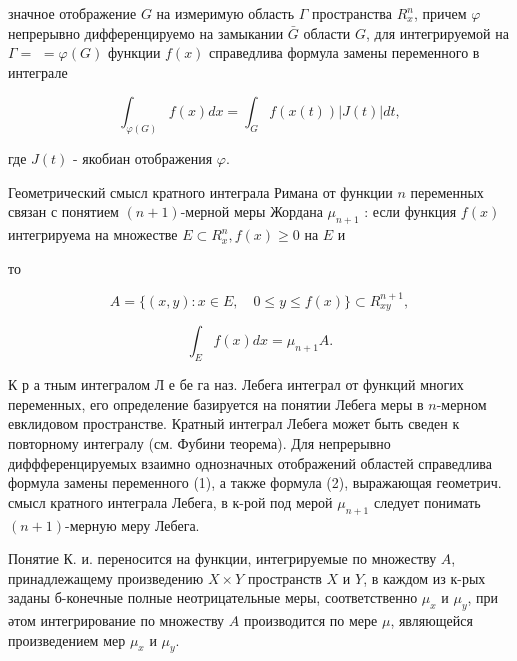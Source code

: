 \documentclass[10pt]{article}
\begin{document}
значное отображение $G$ на измеримую область $\Gamma$ пространства $R_{x}^{n}$, причем $\varphi$ непрерывно дифференцируемо на замыкании $\bar{G}$ области $G$, для интегрируемой на $\Gamma=$ $=\varphi(G)$ функции $f(x)$ справедлива формула замены переменного в интеграле



\[

\int_{\varphi(G)} f(x) d x=\int_{G} f(x(t))|J(t)| d t,

\]



где $J(t)$ - якобиан отображения $\varphi$.



Геометрический смысл кратного интеграла Римана от функции $n$ переменных связан с понятием $(n+1)$-мерной меры Жордана $\mu_{n+1}$ : если функция $f(x)$ интегрируема на множестве $E \subset R_{x}^{n}, f(x) \geqslant 0$ на $E$ и



то



\[

A=\{(x, y): x \in E, \quad 0 \leqslant y \leqslant f(x)\} \subset R_{x y}^{n+1},

\]



\[

\int_{E} f(x) d x=\mu_{n+1} A .

\]



К р а тным интегралом Л е бе га наз. Лебега интеграл от функций многих переменных, его определение базируется на понятии Лебега меры в $n$-мерном евклидовом пространстве. Кратный интеграл Лебега может быть сведен к повторному интегралу (см. Фубини теорема). Для непрерывно диффференцируемых взаимно однозначных отображений областей справедлива формула замены переменного (1), а также формула (2), выражающая геометрич. смысл кратного интеграла Лебега, в к-рой под мерой $\mu_{n+1}$ следует понимать $(n+1)$-мерную меру Лебега.



Понятие К. и. переносится на функции, интегрируемые по множеству $A$, принадлежащему произведению $X \times Y$ пространств $X$ и $Y$, в каждом из к-рых заданы б-конечные полные неотрицательные меры, соответственно $\mu_{x}$ и $\mu_{y}$, при әтом интегрирование по множеству $A$ производится по мере $\mu$, являющейся произведением мер $\mu_{x}$ и $\mu_{y}$.
\end{document}
